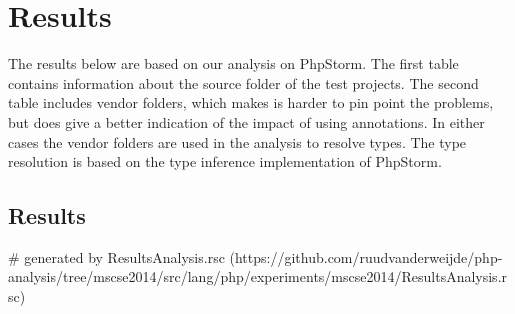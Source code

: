 \documentclass[main.tex]{subfiles}
\begin{document}
    \chapter{Results}\label{ch:results}
    The results below are based on our analysis on PhpStorm.
    The first table contains information about the source folder of the test projects.
    The second table includes vendor folders, which makes is harder to pin point the problems, but does give a better indication of the impact of using annotations.
    In either cases the vendor folders are used in the analysis to resolve types.
    The type resolution is based on the type inference implementation of PhpStorm.
    
    \section{Results}
    
    
    
    
    
    
# generated by ResultsAnalysis.rsc (https://github.com/ruudvanderweijde/php-analysis/tree/mscse2014/src/lang/php/experiments/mscse2014/ResultsAnalysis.rsc)
    
\end{document}
